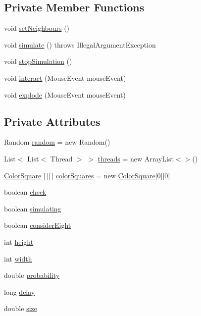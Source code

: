 \subsection*{Private Member Functions}
\begin{DoxyCompactItemize}
\item 
void \mbox{\hyperlink{classsample_1_1_controller_aa3c5a41167ea532943e2891299516ef5}{set\+Neighbours}} ()
\item 
void \mbox{\hyperlink{classsample_1_1_controller_a946710317fcb002fb9f1f21ca32401ad}{simulate}} ()  throws Illegal\+Argument\+Exception 
\item 
void \mbox{\hyperlink{classsample_1_1_controller_a550457284b984d131eefac5c4988dd70}{stop\+Simulation}} ()
\item 
void \mbox{\hyperlink{classsample_1_1_controller_a2fc9e4d80a35b80d030359116c6c8ef5}{interact}} (Mouse\+Event mouse\+Event)
\item 
void \mbox{\hyperlink{classsample_1_1_controller_a25b8717bc408df9520e1b12b57d49d71}{explode}} (Mouse\+Event mouse\+Event)
\end{DoxyCompactItemize}
\subsection*{Private Attributes}
\begin{DoxyCompactItemize}
\item 
Random \mbox{\hyperlink{classsample_1_1_controller_a1adc4f8a826a995bc6d1bfc5169c2b6c}{random}} = new Random()
\item 
List$<$ List$<$ Thread $>$ $>$ \mbox{\hyperlink{classsample_1_1_controller_a179287b4b306d390bfd2861ebd896d0d}{threads}} = new Array\+List$<$$>$()
\item 
\mbox{\hyperlink{classsample_1_1_color_square}{Color\+Square}} \mbox{[}$\,$\mbox{]}\mbox{[}$\,$\mbox{]} \mbox{\hyperlink{classsample_1_1_controller_aeb096ea8a6b56a935bcef6e3cd639047}{color\+Squares}} = new \mbox{\hyperlink{classsample_1_1_color_square}{Color\+Square}}\mbox{[}0\mbox{]}\mbox{[}0\mbox{]}
\item 
boolean \mbox{\hyperlink{classsample_1_1_controller_aea731cf67bae06ace5e32f8ca4626973}{check}}
\item 
boolean \mbox{\hyperlink{classsample_1_1_controller_a7cd890c7f32c535d9ce07f342e3cf1fb}{simulating}}
\item 
boolean \mbox{\hyperlink{classsample_1_1_controller_a1b81427cf0d83cca4a49e5c45b492b93}{consider\+Eight}}
\item 
int \mbox{\hyperlink{classsample_1_1_controller_a577ce0889d506a8a26dab18de17fd67c}{height}}
\item 
int \mbox{\hyperlink{classsample_1_1_controller_a2f7eab44e045182aabcf2d09c6a382ae}{width}}
\item 
double \mbox{\hyperlink{classsample_1_1_controller_a0e42152dde737b173681e1d417e60866}{probability}}
\item 
long \mbox{\hyperlink{classsample_1_1_controller_aba630790fe788096211b6c7d36501c75}{delay}}
\item 
double \mbox{\hyperlink{classsample_1_1_controller_adb40d735a39d472a1891c1ecc8736252}{size}}
\end{DoxyCompactItemize}


